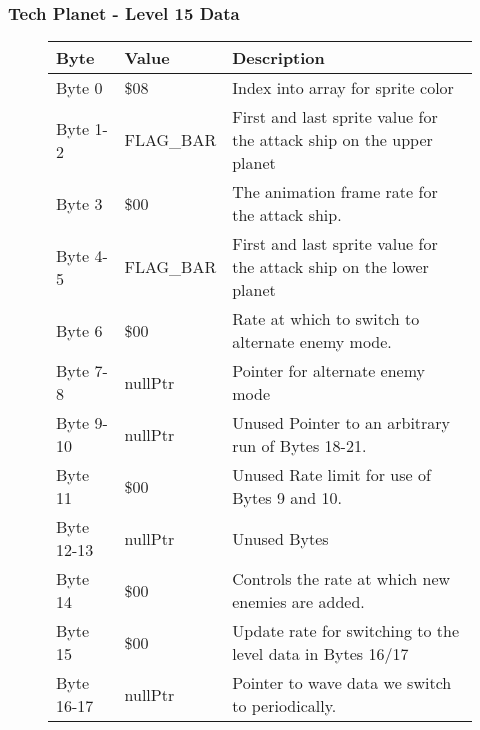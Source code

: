 \clearpage
\subsubsection{Tech Planet - Level 15 Data}

\begin{figure}[H]
  {
  \setlength{\tabcolsep}{3.0pt}
  \setlength\cmidrulewidth{\heavyrulewidth} %
  \begin{adjustbox}{width=12cm}

\begin{tabular}{lll}
\toprule
 Byte       & Value                      & Description                                                         \\
\midrule
 Byte 0     & \$08                        & Index into array for sprite color                                   \\
 Byte 1-2   & FLAG\_BAR                   & First and last sprite value for the attack ship on the upper planet \\
 Byte 3     & \$00                        & The animation frame rate for the attack ship.                       \\
 Byte 4-5   & FLAG\_BAR                   & First and last sprite value for the attack ship on the lower planet \\
 Byte 6     & \$00                        & Rate at which to switch to alternate enemy mode.                    \\
 Byte 7-8   & nullPtr                    & Pointer for alternate enemy mode                                    \\
 Byte 9-10  & nullPtr                    & Unused Pointer to an arbitrary run of Bytes 18-21.                  \\
 Byte 11    & \$00                        & Unused Rate limit for use of Bytes 9 and 10.                        \\
 Byte 12-13 & nullPtr                    & Unused Bytes                                                        \\
 Byte 14    & \$00                        & Controls the rate at which new enemies are added.                   \\
 Byte 15    & \$00                        & Update rate for switching to the level data in Bytes 16/17          \\
 Byte 16-17 & nullPtr                    & Pointer to wave data we switch to periodically.                     \\

\end{tabular}
\end{adjustbox}}
\end{figure}

